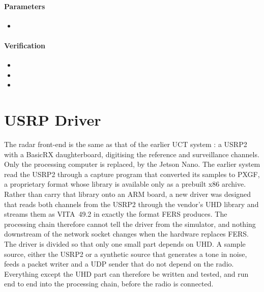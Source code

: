 \paragraph{Parameters}
\begin{itemize}
    \item {}
\end{itemize}

\paragraph{Verification}
\begin{itemize}
    \item {}
    \item {}
    \item {}
\end{itemize}

\section{USRP Driver}
\label{sec:ch4.driver}

The radar front-end is the same as that of the earlier UCT system \citep{tong2014}: a USRP2 with a BasicRX daughterboard, digitising the reference and surveillance channels.  Only the processing computer is replaced, by the Jetson Nano. The earlier system read the USRP2 through a capture program that converted its samples to PXGF, a proprietary format whose library is available only as a prebuilt x86 archive. Rather than carry that library onto an ARM board, a new driver was designed that reads both channels from the USRP2 through the vendor's UHD library and streams them as VITA~49.2 in exactly the format FERS produces. The processing chain therefore cannot tell the driver from the simulator, and nothing downstream of the network socket changes when the hardware replaces FERS. The driver is divided so that only one small part depends on UHD. A sample source, either the USRP2 or a synthetic source that generates a tone in noise, feeds a packet writer and a UDP sender that do not depend on the radio. Everything except the UHD part can therefore be written and tested, and run end to end into the processing chain, before the radio is connected.

